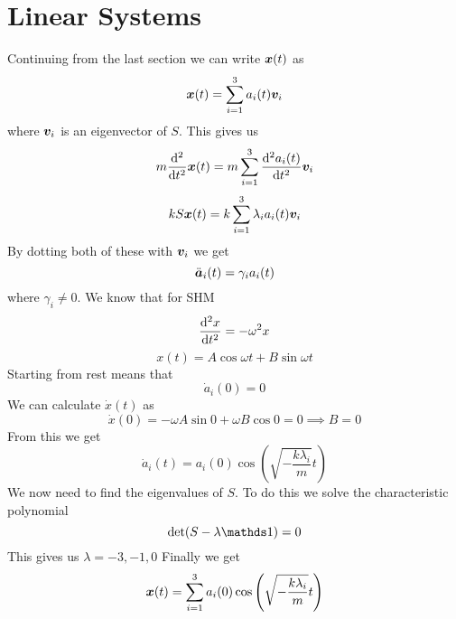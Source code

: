 \documentclass{article}
\begin{document}
    \section{Linear Systems}
    Continuing from the last section we can write \(\bm{x}(t)\) as
    \[\bm{x}(t) = \sum_{i=1}^{3}a_i(t)\bm{v}_i \]
    where \(\bm{v}_i\) is an eigenvector of \(S\).
    This gives us
    \[m\dv[2]{t}\bm{x}(t) = m\sum_{i=1}^{3}\dv[2]{a_i(t)}{t}\bm{v}_i\]
    \[kS\bm{x}(t) = k\sum_{i=1}^3\lambda_i a_i(t)\bm{v}_i\]
    By dotting both of these with \(\bm{v}_i\) we get
    \[\ddot{\bm{a}}_i(t) = \gamma_i a_i(t)\]
    where \(\gamma_i \ne 0\).
    We know that for SHM
    \[\dv[2]{x}{t} = -\omega^2 x\]
    \[x(t) = A\cos\omega t + B\sin\omega t\]
    Starting from rest means that
    \[\dot a_i(0) = 0\]
    We can calculate \(\dot x(t)\) as
    \[\dot x(0) = -\omega A\sin 0 + \omega B\cos 0 = 0\implies B = 0\]
    From this we get
    \[\dot a_i(t) = a_i(0)\cos\left(\sqrt{-\frac{k\lambda_i}{m}}t\right)\]
    We now need to find the eigenvalues of \(S\).
    To do this we solve the characteristic polynomial
    \[\det(S - \lambda\ident) = 0\]
    This gives us \(\lambda = -3, -1, 0\)
    Finally we get
    \[\bm{x}(t) = \sum_{i = 1}^3a_i(0)\cos\left(\sqrt{-\frac{k\lambda_i}{m}}t\right)\]
    
\end{document}
